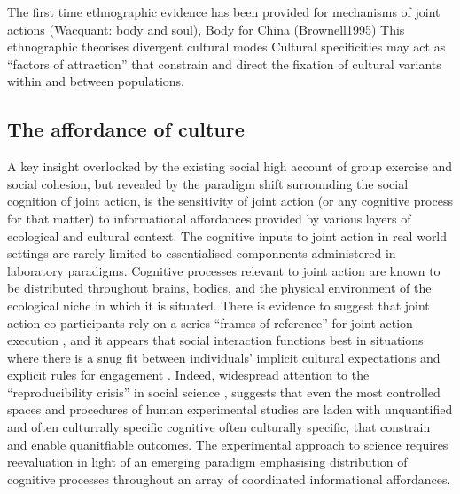 


The first time ethnographic evidence has been provided for mechanisms of joint actions (Wacquant: body and soul), Body for China (Brownell1995)
This ethnographic theorises divergent cultural modes
Cultural specificities may act as ``factors of attraction'' \citep{Sperber2014} that constrain and direct the fixation of cultural variants within and between populations.







\subsection{The affordance of culture}
A key insight overlooked by the existing social high account of group exercise and social cohesion, but revealed by the paradigm shift surrounding the social cognition of joint action, is the sensitivity of joint action (or any cognitive process for that matter) to informational affordances provided by various layers of ecological and cultural context.  The cognitive inputs to joint action in real world settings are rarely limited to essentialised componnents administered in laboratory paradigms. Cognitive processes relevant to joint action are known to be distributed throughout brains, bodies, and the physical environment of the ecological niche in which it is situated.  There is evidence to suggest that joint action co-participants rely on a series ``frames of reference'' for joint action execution \citep{Ray2018}, and it appears that social interaction functions best in situations where there is a snug fit between individuals' implicit cultural expectations and explicit rules for engagement \citep{Vollan2017}.  Indeed, widespread attention to the ``reproducibility crisis'' in social science \citep{Earp2015,Rathmacher2017}, suggests that even the most controlled spaces and procedures of human experimental studies are laden with unquantified and often culturrally specific cognitive often culturally specific, that constrain and enable quanitfiable outcomes.  The experimental approach to science requires reevaluation in light of an emerging paradigm emphasising distribution of cognitive processes throughout an array of coordinated informational affordances.

